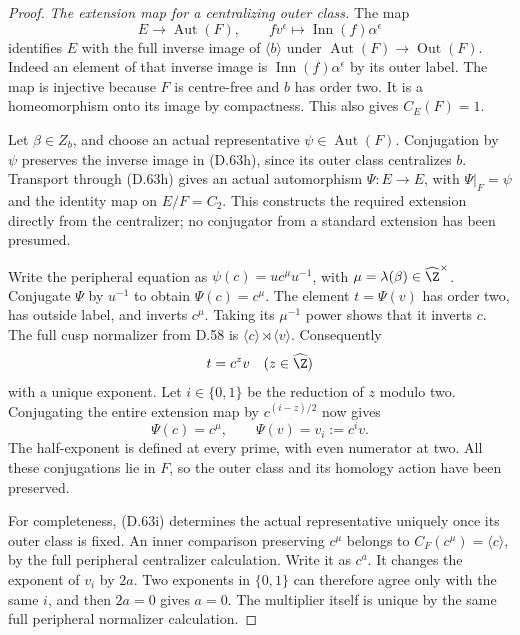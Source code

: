 \begin{proof}
\emph{The extension map for a centralizing outer class.}
The map
\[
 E\longrightarrow\operatorname{Aut}(F),\qquad
       f v^\epsilon\longmapsto
                  \operatorname{Inn}(f)\alpha^\epsilon
                                                               \tag{D.63h}
\]
identifies $E$ with the full inverse image of
$\langle b\rangle$ under
$\operatorname{Aut}(F)\to\operatorname{Out}(F)$.
Indeed an element of that inverse image is
$\operatorname{Inn}(f)\alpha^\epsilon$ by its outer label.
The map is injective because $F$ is centre-free and
$b$ has order two. It is a homeomorphism onto its image
by compactness. This also gives $C_E(F)=1$.

Let $\beta\in Z_b$, and choose an actual representative
$\psi\in\operatorname{Aut}(F)$.
Conjugation by $\psi$ preserves the inverse image in
(D.63h), since its outer class centralizes $b$.
Transport through (D.63h) gives an actual automorphism
$\Psi:E\to E$, with
$\Psi|_F=\psi$ and the identity map on $E/F=C_2$.
This constructs the required extension directly from
the centralizer; no conjugator from a standard
extension has been presumed.

Write the peripheral equation as
$\psi(c)=u c^\mu u^{-1}$, with
$\mu=\lambda(\beta)\in\widehat\Z^\times$.
Conjugate $\Psi$ by $u^{-1}$ to obtain
$\Psi(c)=c^\mu$.
The element $t=\Psi(v)$ has order two, has outside
label, and inverts $c^\mu$.
Taking its $\mu^{-1}$ power shows that it inverts $c$.
The full cusp normalizer from D.58 is
$\langle c\rangle\rtimes\langle v\rangle$.
Consequently
\[
                      t=c^zv
                 \quad(z\in\widehat\Z)
\]
with a unique exponent.
Let $i\in\{0,1\}$ be the reduction of $z$ modulo two.
Conjugating the entire extension map by
$c^{(i-z)/2}$ now gives
\[
                \Psi(c)=c^\mu,\qquad
                \Psi(v)=v_i:=c^iv.                           \tag{D.63i}
\]
The half-exponent is defined at every prime, with
even numerator at two.
All these conjugations lie in $F$, so the outer
class and its homology action have been preserved.

For completeness, (D.63i) determines the actual
representative uniquely once its outer class is fixed.
An inner comparison preserving $c^\mu$ belongs to
$C_F(c^\mu)=\langle c\rangle$, by the full peripheral
centralizer calculation. Write it as $c^a$.
It changes the exponent of $v_i$ by $2a$.
Two exponents in $\{0,1\}$ can therefore agree only
with the same $i$, and then $2a=0$ gives $a=0$.
The multiplier itself is unique by the same full
peripheral normalizer calculation.


\end{proof}
